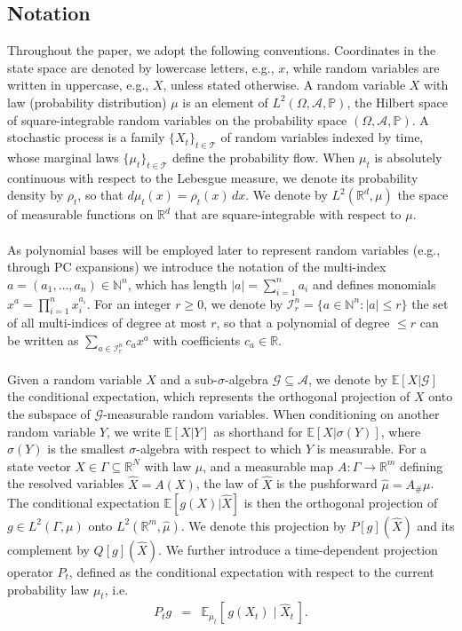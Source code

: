 \documentclass[11pt, a4paper, oneside, reqno]{amsart}
\begin{document}
\subsection{Notation}
\noindent Throughout the paper, we adopt the following conventions. Coordinates in the state space are denoted by lowercase letters, e.g., $x$, while random variables are written in uppercase, e.g., $X$, unless stated otherwise. A random variable $X$ with law (probability distribution) $\mu$ is an element of $L^2(\Omega,\mathcal{A},\mathbb{P})$, the Hilbert space of square-integrable random variables on the probability space $(\Omega,\mathcal{A},\mathbb{P})$. A stochastic process is a family $\{X_t\}_{t\in\mathcal{T}}$ of random variables indexed by time, whose marginal laws $\{\mu_t\}_{t\in\mathcal{T}}$ define the probability flow. When $\mu_t$ is absolutely continuous with respect to the Lebesgue measure, we denote its probability density by $\rho_t$, so that $d\mu_t(x)=\rho_t(x)\,dx$. We denote by $L^2(\mathbb{R}^d,\mu)$ the space of measurable functions on $\mathbb{R}^d$ that are square-integrable with respect to $\mu$. \\ \ \\
As polynomial bases will be employed later to represent random variables (e.g., through PC expansions) we introduce the notation of the multi-index  $a=(a_1,\ldots,a_n)\in\mathbb{N}^n$, which has length $|a|=\sum_{i=1}^n a_i$ and defines monomials $x^a=\prod_{i=1}^n x_i^{a_i}$. For an integer $r\ge0$, we denote by $\mathcal{I}_r^n=\{a\in\mathbb{N}^n:|a|\le r\}$ the set of all multi-indices of degree at most $r$, so that a polynomial of degree $\le r$ can be written as $\sum_{a\in \mathcal{I}_r^n} c_a x^a$ with coefficients $c_a\in\mathbb{R}$. \\ \ \\
Given a random variable $X$ and a sub-$\sigma$-algebra $\mathcal{G}\subseteq\mathcal{A}$, we denote by $\mathbb{E}[X|\mathcal{G}]$ the conditional expectation, which represents the orthogonal projection of $X$ onto the subspace of $\mathcal{G}$-measurable random variables. When conditioning on another random variable $Y$, we write $\mathbb{E}[X|Y]$ as shorthand for $\mathbb{E}[X|\sigma(Y)]$, where $\sigma(Y)$ is the smallest $\sigma$-algebra with respect to which $Y$ is measurable. For a state vector $X\in\Gamma\subseteq\mathbb{R}^N$ with law $\mu$, and a measurable map $A:\Gamma\to\mathbb{R}^m$ defining the resolved variables 
$\hat X=A(X)$,
the law of $\hat X$ is the pushforward $\hat{\mu}=A_\#\mu$. The conditional expectation $\mathbb{E}[g(X)|\hat X]$ is then the orthogonal projection of $g\in L^2(\Gamma,\mu)$ onto $L^2(\mathbb{R}^m,\hat\mu)$. We denote this projection by $P[g](\hat X)$ and its complement by $Q[g](\hat X)$. We further introduce a {time-dependent projection operator} $P_t$, defined as the conditional expectation with respect to the current probability law $\mu_t$, i.e. 
\begin{eqnarray}
P_t g &=& \mathbb{E}_{\mu_t}[\,g(X_t)\mid \hat{X}_t\,]. \nonumber
\end{eqnarray}
\end{document}
